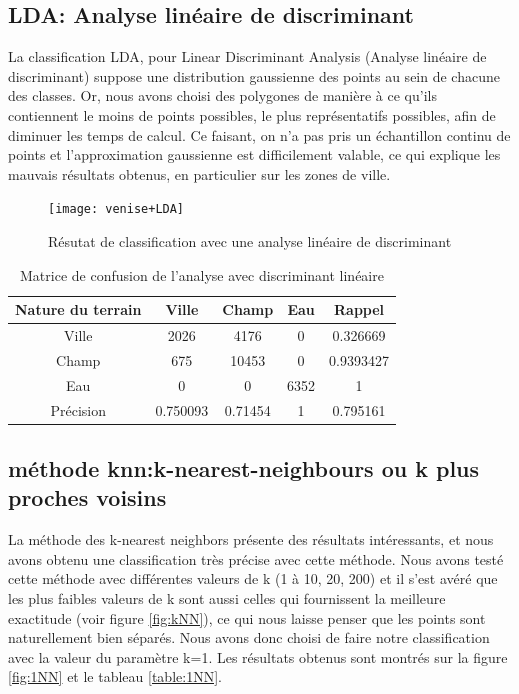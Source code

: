 \documentclass[a4paper,10pt]{article}
\begin{document}
\subsection{LDA: Analyse linéaire de discriminant}
La classification LDA, pour Linear Discriminant Analysis (Analyse linéaire de discriminant) suppose une distribution gaussienne des points au sein de chacune des classes. Or, nous avons choisi des polygones de manière à ce qu'ils contiennent le moins de points possibles, le plus représentatifs possibles, afin de diminuer les temps de calcul. Ce faisant, on n'a pas pris un échantillon continu de points et l'approximation gaussienne est difficilement valable, ce qui explique les mauvais résultats obtenus, en particulier sur les zones de ville.
\begin{figure}
  \centering
    \texttt{[image: venise+LDA]}
  \caption{Résutat de classification avec une analyse linéaire de discriminant}
  \label{fig:veniseLDA}
\end{figure}

\begin{table}
\begin{center}
 \begin{tabular}{|c|c|c|c|c|}
  \hline
  Nature du terrain & Ville & Champ & Eau & Rappel \\
  \hline
Ville & 2026  &   4176  &      0 & 0.326669 \\
Champ & 675  &  10453   &     0 & 0.9393427 \\
Eau &  0    &    0  &   6352   &     1 \\
Précision & 0.750093 & 0.71454  &      1 & 0.795161\\
  \hline
\end{tabular}
\end{center}
\caption{Matrice de confusion de l'analyse avec discriminant linéaire }
\label{table:veniseLDA}
\end{table}
    
     

\subsection{méthode knn:k-nearest-neighbours ou k plus proches voisins}
La méthode des k-nearest neighbors présente des résultats intéressants, et nous avons obtenu une classification très précise avec cette méthode. Nous avons testé cette méthode avec différentes valeurs de k (1 à 10, 20, 200) et il s'est avéré que les plus faibles valeurs de k sont aussi celles qui fournissent la meilleure exactitude (voir figure \ref{fig:kNN}), ce qui nous laisse penser que les points sont naturellement bien séparés. Nous avons donc choisi de faire notre classification avec la valeur du paramètre k=1. Les résultats obtenus sont montrés sur la figure \ref{fig:1NN} et le tableau \ref{table:1NN}.
\end{document}

